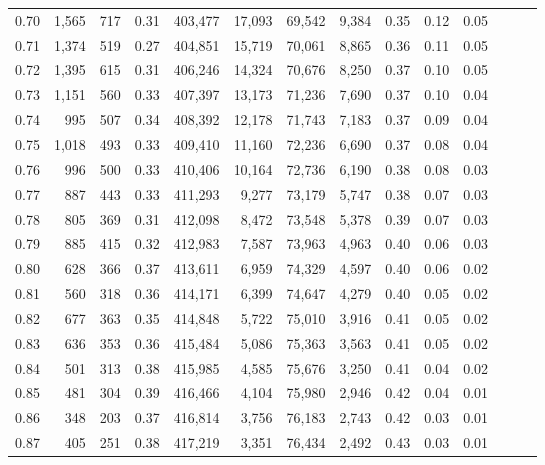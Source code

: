 \begin{tabular}{rrrrrrrrrrrrrr}
0.70 &   1,565 &    717 &  0.31 &  403,477 &   17,093 &  69,542 &   9,384 &  0.35 &  0.12 &      0.05 \\
0.71 &   1,374 &    519 &  0.27 &  404,851 &   15,719 &  70,061 &   8,865 &  0.36 &  0.11 &      0.05 \\
0.72 &   1,395 &    615 &  0.31 &  406,246 &   14,324 &  70,676 &   8,250 &  0.37 &  0.10 &      0.05 \\
0.73 &   1,151 &    560 &  0.33 &  407,397 &   13,173 &  71,236 &   7,690 &  0.37 &  0.10 &      0.04 \\
0.74 &     995 &    507 &  0.34 &  408,392 &   12,178 &  71,743 &   7,183 &  0.37 &  0.09 &      0.04 \\
0.75 &   1,018 &    493 &  0.33 &  409,410 &   11,160 &  72,236 &   6,690 &  0.37 &  0.08 &      0.04 \\
0.76 &     996 &    500 &  0.33 &  410,406 &   10,164 &  72,736 &   6,190 &  0.38 &  0.08 &      0.03 \\
0.77 &     887 &    443 &  0.33 &  411,293 &    9,277 &  73,179 &   5,747 &  0.38 &  0.07 &      0.03 \\
0.78 &     805 &    369 &  0.31 &  412,098 &    8,472 &  73,548 &   5,378 &  0.39 &  0.07 &      0.03 \\
0.79 &     885 &    415 &  0.32 &  412,983 &    7,587 &  73,963 &   4,963 &  0.40 &  0.06 &      0.03 \\
0.80 &     628 &    366 &  0.37 &  413,611 &    6,959 &  74,329 &   4,597 &  0.40 &  0.06 &      0.02 \\
0.81 &     560 &    318 &  0.36 &  414,171 &    6,399 &  74,647 &   4,279 &  0.40 &  0.05 &      0.02 \\
0.82 &     677 &    363 &  0.35 &  414,848 &    5,722 &  75,010 &   3,916 &  0.41 &  0.05 &      0.02 \\
0.83 &     636 &    353 &  0.36 &  415,484 &    5,086 &  75,363 &   3,563 &  0.41 &  0.05 &      0.02 \\
0.84 &     501 &    313 &  0.38 &  415,985 &    4,585 &  75,676 &   3,250 &  0.41 &  0.04 &      0.02 \\
0.85 &     481 &    304 &  0.39 &  416,466 &    4,104 &  75,980 &   2,946 &  0.42 &  0.04 &      0.01 \\
0.86 &     348 &    203 &  0.37 &  416,814 &    3,756 &  76,183 &   2,743 &  0.42 &  0.03 &      0.01 \\
0.87 &     405 &    251 &  0.38 &  417,219 &    3,351 &  76,434 &   2,492 &  0.43 &  0.03 &      0.01 \\

\end{tabular}
